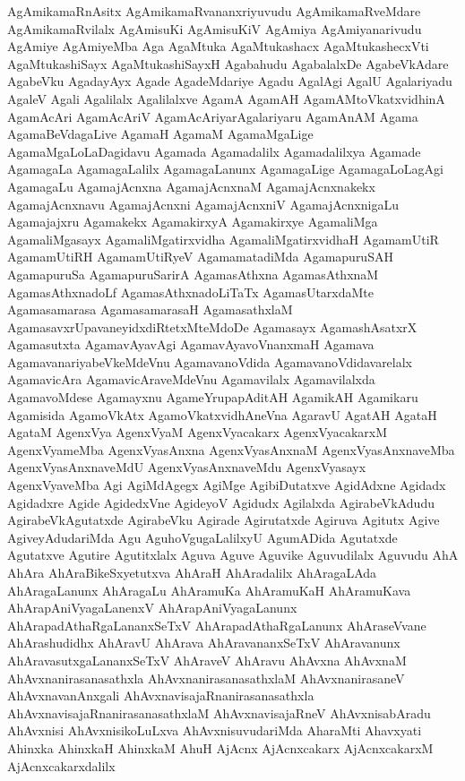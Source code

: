 {AgAmikamaRnAsitx
AgAmikamaRvananxriyuvudu
AgAmikamaRveMdare
AgAmikamaRvilalx
AgAmisuKi
AgAmisuKiV
AgAmiya
AgAmiyanarivudu
AgAmiye
AgAmiyeMba
Aga
AgaMtuka
AgaMtukashacx
AgaMtukashecxVti
AgaMtukashiSayx
AgaMtukashiSayxH
Agabahudu
AgabalalxDe
AgabeVkAdare
AgabeVku
AgadayAyx
Agade
AgadeMdariye
Agadu
AgalAgi
AgalU
Agalariyadu
AgaleV
Agali
Agalilalx
Agalilalxve
AgamA
AgamAH
AgamAMtoVkatxvidhinA
AgamAcAri
AgamAcAriV
AgamAcAriyarAgalariyaru
AgamAnAM
Agama
AgamaBeVdagaLive
AgamaH
AgamaM
AgamaMgaLige
AgamaMgaLoLaDagidavu
Agamada
Agamadalilx
Agamadalilxya
Agamade
AgamagaLa
AgamagaLalilx
AgamagaLanunx
AgamagaLige
AgamagaLoLagAgi
AgamagaLu
AgamajAcnxna
AgamajAcnxnaM
AgamajAcnxnakekx
AgamajAcnxnavu
AgamajAcnxni
AgamajAcnxniV
AgamajAcnxnigaLu
Agamajajxru
Agamakekx
AgamakirxyA
Agamakirxye
AgamaliMga
AgamaliMgasayx
AgamaliMgatirxvidha
AgamaliMgatirxvidhaH
AgamamUtiR
AgamamUtiRH
AgamamUtiRyeV
AgamamatadiMda
AgamapuruSAH
AgamapuruSa
AgamapuruSarirA
AgamasAthxna
AgamasAthxnaM
AgamasAthxnadoLf
AgamasAthxnadoLiTaTx
AgamasUtarxdaMte
Agamasamarasa
AgamasamarasaH
AgamasathxlaM
AgamasavxrUpavaneyidxdiRtetxMteMdoDe
Agamasayx
AgamashAsatxrX
Agamasutxta
AgamavAyavAgi
AgamavAyavoVnanxmaH
Agamava
AgamavanariyabeVkeMdeVnu
AgamavanoVdida
AgamavanoVdidavarelalx
AgamavicAra
AgamavicAraveMdeVnu
Agamavilalx
Agamavilalxda
AgamavoMdese
Agamayxnu
AgameYrupapAditAH
AgamikAH
Agamikaru
Agamisida
AgamoVkAtx
AgamoVkatxvidhAneVna
AgaravU
AgatAH
AgataH
AgataM
AgenxVya
AgenxVyaM
AgenxVyacakarx
AgenxVyacakarxM
AgenxVyameMba
AgenxVyasAnxna
AgenxVyasAnxnaM
AgenxVyasAnxnaveMba
AgenxVyasAnxnaveMdU
AgenxVyasAnxnaveMdu
AgenxVyasayx
AgenxVyaveMba
Agi
AgiMdAgegx
AgiMge
AgibiDutatxve
AgidAdxne
Agidadx
Agidadxre
Agide
AgidedxVne
AgideyoV
Agidudx
Agilalxda
AgirabeVkAdudu
AgirabeVkAgutatxde
AgirabeVku
Agirade
Agirutatxde
Agiruva
Agitutx
Agive
AgiveyAdudariMda
Agu
AguhoVgugaLalilxyU
AgumADida
Agutatxde
Agutatxve
Agutire
Agutitxlalx
Aguva
Aguve
Aguvike
Aguvudilalx
Aguvudu
AhA
AhAra
AhAraBikeSxyetutxva
AhAraH
AhAradalilx
AhAragaLAda
AhAragaLanunx
AhAragaLu
AhAramuKa
AhAramuKaH
AhAramuKava
AhArapAniVyagaLanenxV
AhArapAniVyagaLanunx
AhArapadAthaRgaLananxSeTxV
AhArapadAthaRgaLanunx
AhAraseVvane
AhArashudidhx
AhAravU
AhArava
AhAravananxSeTxV
AhAravanunx
AhAravasutxgaLananxSeTxV
AhAraveV
AhAravu
AhAvxna
AhAvxnaM
AhAvxnanirasanasathxla
AhAvxnanirasanasathxlaM
AhAvxnanirasaneV
AhAvxnavanAnxgali
AhAvxnavisajaRnanirasanasathxla
AhAvxnavisajaRnanirasanasathxlaM
AhAvxnavisajaRneV
AhAvxnisabAradu
AhAvxnisi
AhAvxnisikoLuLxva
AhAvxnisuvudariMda
AharaMti
Ahavxyati
Ahinxka
AhinxkaH
AhinxkaM
AhuH
AjAcnx
AjAcnxcakarx
AjAcnxcakarxM
AjAcnxcakarxdalilx
}
